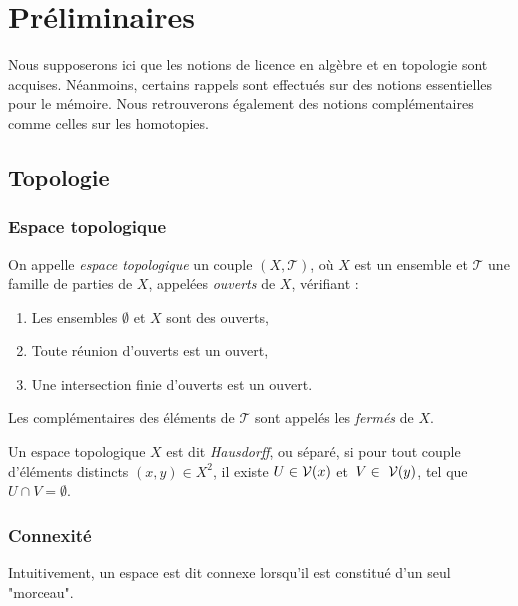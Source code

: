 \section{Préliminaires}

Nous supposerons ici que les notions de licence en algèbre et en topologie sont acquises. Néanmoins, certains rappels sont effectués sur des notions essentielles pour le mémoire. Nous retrouverons également des notions complémentaires comme celles sur les homotopies.

\subsection{Topologie}
\subsubsection{Espace topologique}

\begin{definition}
On appelle \emph{espace topologique} un couple $(X,\mathcal{T})$, où $X$ est un ensemble et $\mathcal{T}$ une famille de parties de $X$, appelées \emph{ouverts} de $X$, vérifiant : \begin{enumerate}
    \item Les ensembles $\emptyset$ et $X$ sont des ouverts,
    \item Toute réunion d'ouverts est un ouvert,
    \item Une intersection finie d'ouverts est un ouvert.
\end{enumerate}
Les complémentaires des éléments de $\mathcal{T}$ sont appelés les \emph{fermés} de $X$.
\end{definition}

\begin{definition}
Un espace topologique $X$ est dit \emph{Hausdorff}, ou séparé, si pour tout couple d'éléments distincts $(x,y)\in X^2$, il existe $U\in\mathcal{V}(x)$ et~$V\in~\mathcal{V}(y)$, tel que $U\cap V=\emptyset$.
\end{definition}

\subsubsection{Connexité}

Intuitivement, un espace est dit connexe lorsqu'il est constitué d'un seul "morceau".

